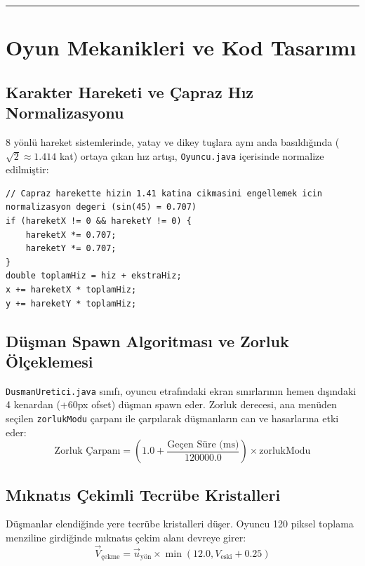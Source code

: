 \documentclass[12pt]{article}
\begin{document}
\bigskip
\hrule
\bigskip

\section{Oyun Mekanikleri ve Kod Tasarımı}

\subsection{Karakter Hareketi ve Çapraz Hız Normalizasyonu}
8 yönlü hareket sistemlerinde, yatay ve dikey tuşlara aynı anda basıldığında ($\sqrt{2} \approx 1.414$ kat) ortaya çıkan hız artışı, \texttt{Oyuncu.java} içerisinde normalize edilmiştir:

\begin{lstlisting}[caption={Çapraz Harekette Hız Normalizasyonu}, label={list:normalizasyon}]
// Capraz harekette hizin 1.41 katina cikmasini engellemek icin normalizasyon degeri (sin(45) = 0.707)
if (hareketX != 0 && hareketY != 0) {
    hareketX *= 0.707;
    hareketY *= 0.707;
}
double toplamHiz = hiz + ekstraHiz;
x += hareketX * toplamHiz;
y += hareketY * toplamHiz;
\end{lstlisting}

\subsection{Düşman Spawn Algoritması ve Zorluk Ölçeklemesi}
\texttt{DusmanUretici.java} sınıfı, oyuncu etrafındaki ekran sınırlarının hemen dışındaki 4 kenardan (+60px ofset) düşman spawn eder. Zorluk derecesi, ana menüden seçilen \texttt{zorlukModu} çarpanı ile çarpılarak düşmanların can ve hasarlarına etki eder:
\begin{equation}
    \text{Zorluk Çarpanı} = \left( 1.0 + \frac{\text{Geçen Süre (ms)}}{120000.0} \right) \times \text{zorlukModu}
\end{equation}

\subsection{Mıknatıs Çekimli Tecrübe Kristalleri}
Düşmanlar elendiğinde yere tecrübe kristalleri düşer. Oyuncu 120 piksel toplama menziline girdiğinde mıknatıs çekim alanı devreye girer:
\begin{equation}
    \vec{V}_{\text{çekme}} = \vec{u}_{\text{yön}} \times \min(12.0, V_{\text{eski}} + 0.25)
\end{equation}
\end{document}
